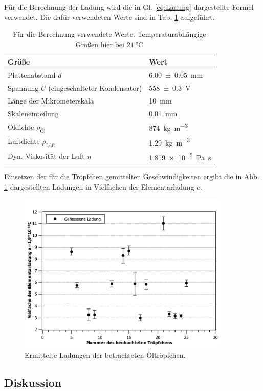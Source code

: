 Für die Berechnung der Ladung wird die in Gl. \ref{eq:Ladung} dargestellte Formel verwendet.
Die dafür verwendeten Werte sind in Tab. \ref{tab:werte} aufgeführt.
\begin{table}
	\centering
	\caption{Für die Berechnung verwendete Werte. Temperaturabhängige Größen hier bei $\SI{21}{\celsius}$}
	\label{tab:werte}
	\begin{tabular}{l|l}
		{Größe} & {Wert}	\\
		\hline
		{Plattenabstand $d$} & {\SI{6,00+-0,05}{\mm}} \\
		{Spannung $U$ (eingeschalteter Kondensator)} & \SI{558+-0.3}{\volt}\\
		{Länge der Mikrometerskala} & {\SI{10}{\mm}} \\
		{Skaleneinteilung} & {\SI{0,01}{\mm}} \\
		{Öldichte $\rho_\text{Öl}$} & {\SI{874}{\kg\per\m^3}} \\
		{Luftdichte $\rho_\text{Luft}$} & {\SI{1,29}{\kg\per\m^3}} \\
		{Dyn. Viskosität der Luft $\eta$} & \SI{1,819e-5}{\pascal\second}\\		
	\end{tabular}
\end{table}
Einsetzen der für die Tröpfchen gemittelten Geschwindigkeiten ergibt die in Abb. \ref{fig:ergebnis} dargestellten Ladungen in Vielfachen der Elementarladung $e$.
\begin{figure}[ht]
	\centering
	\includegraphics[width=0.9\textwidth]{auswertung/elementar_tropfen.pdf}
	\caption{Ermittelte Ladungen der betrachteten Öltröpfchen.}
	\label{fig:ergebnis}	
\end{figure}

\subsection{Diskussion}


